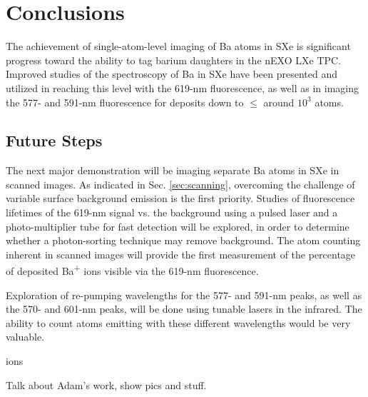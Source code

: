 \chapter{Conclusions}

The achievement of single-atom-level imaging of Ba atoms in SXe is significant progress toward the ability to tag barium daughters in the nEXO LXe TPC.  Improved studies of the spectroscopy of Ba in SXe have been presented and utilized in reaching this level with the 619-nm fluorescence, as well as in imaging the 577- and 591-nm fluorescence for deposits down to $\leq$ around $10^{3}$ atoms.



\section{Future Steps}

The next major demonstration will be imaging separate Ba atoms in SXe in scanned images.  As indicated in Sec. \ref{sec:scanning}, overcoming the challenge of variable surface background emission is the first priority.  Studies of fluorescence lifetimes of the 619-nm signal vs. the background using a pulsed laser and a photo-multiplier tube for fast detection will be explored, in order to determine whether a photon-sorting technique may remove background.  The atom counting inherent in scanned images will provide the first measurement of the percentage of deposited Ba\textsuperscript{+} ions visible via the 619-nm fluorescence.

Exploration of re-pumping wavelengths for the 577- and 591-nm peaks, as well as the 570- and 601-nm peaks, will be done using tunable lasers in the infrared.  The ability to count atoms emitting with these different wavelengths would be very valuable.

ions

Talk about Adam's work, show pics and stuff.